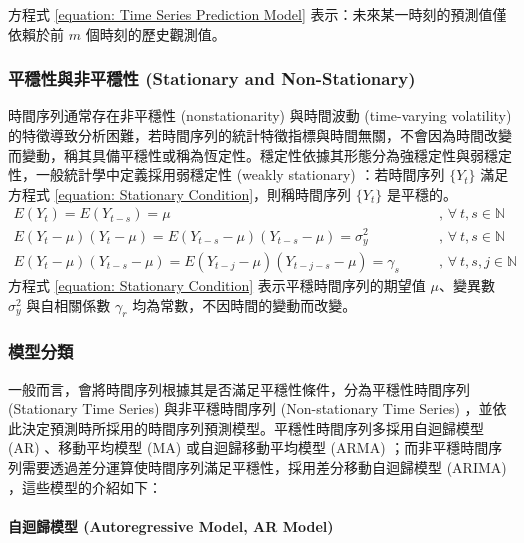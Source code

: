 方程式 \eqref{equation: Time Series Prediction Model} 表示：未來某一時刻的預測值僅依賴於前 $m$ 個時刻的歷史觀測值。

\subsubsection{平穩性與非平穩性 (Stationary and Non-Stationary)}

時間序列通常存在非平穩性 (nonstationarity) 與時間波動 (time-varying volatility) 的特徵導致分析困難，若時間序列的統計特徵指標與時間無關，不會因為時間改變而變動，稱其具備平穩性或稱為恆定性。穩定性依據其形態分為強穩定性與弱穩定性，一般統計學中定義採用弱穩定性 (weakly stationary) ：若時間序列 $\{ Y_t \}$ 滿足方程式 \eqref{equation: Stationary Condition}，則稱時間序列 $\{ Y_t \}$ 是平穩的。
\begin{subequations}\label{equation: Stationary Condition}
  \begin{alignat}{2}
    E(Y_t) = E(Y_{t - s}) = \mu                                                  \qquad & \text{, } \forall~t, s \in \mathbb{N}    \\
    E(Y_t - \mu)(Y_t - \mu) = E(Y_{t-s} - \mu)(Y_{t-s} - \mu) = \sigma_{y}^{2}   \qquad & \text{, } \forall~t, s \in \mathbb{N}    \\
    E(Y_t - \mu)(Y_{t-s} - \mu) = E(Y_{t-j} - \mu)(Y_{t-j-s} - \mu) = \gamma_{s} \qquad & \text{, } \forall~t, s, j \in \mathbb{N}
  \end{alignat}
\end{subequations}
%
方程式 \eqref{equation: Stationary Condition} 表示平穩時間序列的期望值 $\mu$、變異數 $\sigma_{y}^{2}$ 與自相關係數 $\gamma_r$ 均為常數，不因時間的變動而改變。

\subsubsection{模型分類}

一般而言，會將時間序列根據其是否滿足平穩性條件，分為平穩性時間序列 (Stationary Time Series) 與非平穩時間序列 (Non-stationary Time Series) ，並依此決定預測時所採用的時間序列預測模型。平穩性時間序列多採用自迴歸模型 (AR) 、移動平均模型 (MA) 或自迴歸移動平均模型 (ARMA) ；而非平穩時間序列需要透過差分運算使時間序列滿足平穩性，採用差分移動自迴歸模型 (ARIMA) ，這些模型的介紹如下：

\paragraph{自迴歸模型 (Autoregressive Model, AR Model)}

